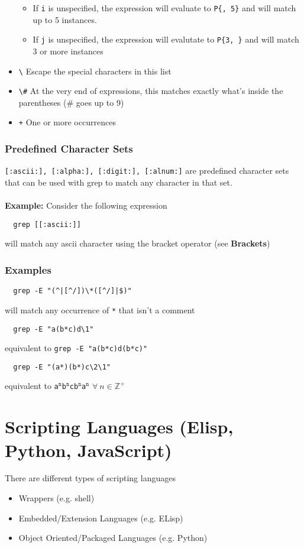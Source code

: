 \documentclass[13pt]{article}
\begin{document}
\begin{itemize}[leftmargin = 0pt]
\begin{itemize}[leftmargin = 0pt]
  \item [] If \texttt{i} is unspecified, the expression will evaluate to \texttt{P\{, 5\}} and will match up to 5 instances. 
  \item [] If \texttt{j} is unspecified, the expression will evalutate to \texttt{P\{3, \}} and will match 3 or more instances
  \end{itemize}
\item [] \texttt{\textbackslash} Escape the special characters in this list
\item [] \texttt{\textbackslash \#} At the very end of expressions, this matches exactly what's inside the parentheses (\# goes up to 9)
\item [] \texttt{+} One or more occurrences
\end{itemize}

\subsubsection{Predefined Character Sets}
\texttt{[:ascii:], [:alpha:], [:digit:], [:alnum:]} are predefined character sets that can be used with grep to match any character in that set. \\ \\
\textbf{Example:} Consider the following expression
\begin{verbatim}
  grep [[:ascii:]] \end{verbatim}
will match any ascii character using the bracket operator (see \textbf{Brackets})
\subsubsection*{Examples}
\begin{verbatim}
  grep -E "(^|[^/])\*([^/]|$)" \end{verbatim}
will match any occurrence of \texttt{*} that isn't a comment
\begin{verbatim}
  grep -E "a(b*c)d\1" \end{verbatim}
equivalent to \texttt{grep -E "a(b*c)d(b*c)"}
\begin{verbatim}
  grep -E "(a*)(b*)c\2\1" \end{verbatim}
equivalent to \texttt{a$^\texttt{n}$b$^\texttt{n}$cb$^\texttt{n}$a$^\texttt{n}$} $\forall \ n \in \mathbb{Z}^+$





\section{Scripting Languages (Elisp, Python, JavaScript)}
There are different types of scripting languages
\begin{itemize}[leftmargin = 0pt]
\item [] Wrappers (e.g. shell)
\item [] Embedded/Extension Languages (e.g. ELisp)
\item [] Object Oriented/Packaged Languages (e.g. Python)
\end{itemize}
\end{document}

